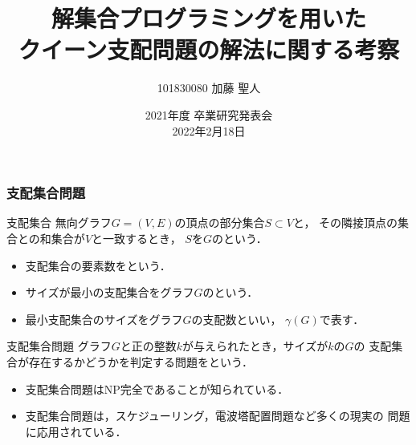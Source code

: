 \documentclass[dvipdfmx,10pt]{beamer}
\begin{document}
\title{解集合プログラミングを用いた\\クイーン支配問題の解法に関する考察}
\author{101830080 \quad 加藤 聖人}
\date{2021年度 卒業研究発表会 \\ 2022年2月18日}

%
%

\begin{frame}\frametitle{}
 \titlepage
\end{frame}

%
%

\begin{frame}\frametitle{支配集合問題}
 \begin{block}{支配集合}
無向グラフ$G=(V,E)$の頂点の部分集合$S\subset V$と，
その隣接頂点の集合との和集合が$V$と一致するとき，
$S$を$G$のという．

  \begin{itemize}
   \item 支配集合の要素数をという．
   \item サイズが最小の支配集合をグラフ$G$のという．
   \item 最小支配集合のサイズをグラフ$G$の\alert{支配数}といい，
$\gamma(G)$で表す．
  \end{itemize}
 \end{block}
 \begin{block}{支配集合問題}
  グラフ$G$と正の整数$k$が与えられたとき，サイズが$k$の$G$の
支配集合が存在するかどうかを判定する問題をという．
  \begin{itemize}
   \item 支配集合問題はNP完全であることが知られている．
   \item 支配集合問題は，スケジューリング，電波塔配置問題など多くの現実の
	 問題に応用されている．
  \end{itemize}
 \end{block}
\end{frame}

%
%
\end{document}

